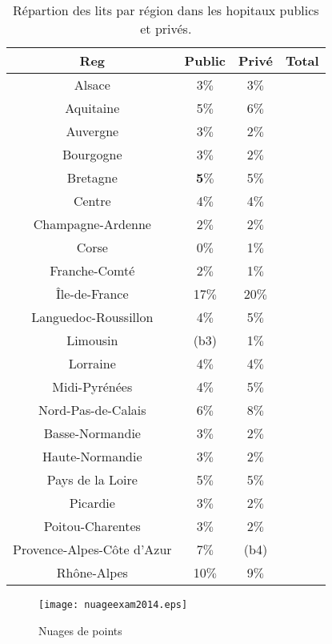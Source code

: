 \documentclass[a4paper,11pt]{article}
\begin{document}
\begin{table}
\begin{center}
\begin{tabular}{|c||c|c||c|}
\hline
\textbf{Reg}&\textbf{Public}& \textbf{Privé} & \textbf{Total}\\ \hline \hline

Alsace&3$\%$&3$\%$&\\ \hline

Aquitaine&5$\%$&6$\%$&\\ \hline

Auvergne&3$\%$&2$\%$&\\ \hline

Bourgogne&3$\%$&2$\%$&\\ \hline

Bretagne&{\large \textbf{5}$\%$}&5$\%$&\\ \hline

Centre&4$\%$&4$\%$&\\ \hline

Champagne-Ardenne&2$\%$&2$\%$&\\ \hline

Corse&0$\%$&1$\%$&\\ \hline

Franche-Comté&2$\%$&1$\%$&\\ \hline

Île-de-France&17$\%$&20$\%$&\\ \hline

Languedoc-Roussillon&4$\%$&5$\%$&\\ \hline

Limousin&(b3)&1$\%$&\\ \hline

Lorraine&4$\%$&4$\%$&\\ \hline

Midi-Pyrénées&4$\%$&5$\%$&\\ \hline

Nord-Pas-de-Calais&6$\%$&8$\%$&\\ \hline

Basse-Normandie&3$\%$&2$\%$&\\ \hline

Haute-Normandie&3$\%$&2$\%$&\\ \hline

Pays de la Loire&5$\%$&5$\%$&\\ \hline

Picardie&3$\%$&2$\%$&\\ \hline

Poitou-Charentes&3$\%$&2$\%$&\\ \hline

Provence-Alpes-Côte d'Azur&7$\%$&(b4)&\\ \hline

Rhône-Alpes&10$\%$&9$\%$&\\ \hline
\end{tabular} 
\caption{Répartion des lits par région dans les hopitaux publics et privés.}
\label{tab:region}
\end{center}
\end{table}

\begin{figure}
\texttt{[image: nuageexam2014.eps]} 
\caption{Nuages de points}
\end{figure}
\end{document}
